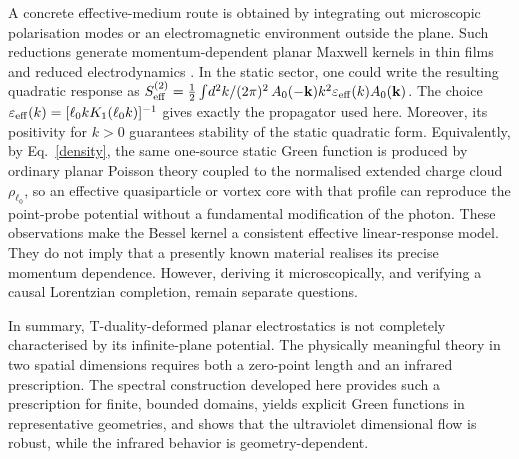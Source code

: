 \documentclass[openacc]{rsproca_new}%
\newcommand{\revadd}[1]{#1}
\begin{document}
\revadd{A concrete effective-medium route is obtained by integrating out microscopic polarisation modes or an electromagnetic environment outside the plane. Such reductions generate momentum-dependent planar Maxwell kernels in thin films and reduced electrodynamics \cite{Pearl1964, LaNaveLimtragoolPhillips2019}. In the static sector, one could write the resulting quadratic response as $S_{\rm eff}^{(2)}=\tfrac12\int \!d^2k/(2\pi)^2\,A_0(-\mathbf k)k^2\varepsilon_{\rm eff}(k)A_0(\mathbf k)$. The choice $\varepsilon_{\rm eff}(k)=[\ell_0kK_1(\ell_0k)]^{-1}$ gives exactly the propagator used here. Moreover, its positivity for $k>0$ guarantees stability of the static quadratic form. Equivalently, by Eq.~\eqref{density}, the same one-source static Green function is produced by ordinary planar Poisson theory coupled to the normalised extended charge cloud $\rho_{\ell_0}$, so an effective quasiparticle or vortex core with that profile can reproduce the point-probe potential without a fundamental modification of the photon. These observations make the Bessel kernel a consistent effective linear-response model. They do not imply that a presently known material realises its precise momentum dependence. However, deriving it microscopically, and verifying a causal Lorentzian completion, remain separate questions.}

In summary, T-duality-deformed planar electrostatics is not completely characterised by its infinite-plane potential. The physically meaningful theory in two spatial dimensions requires both a zero-point length and an infrared prescription. The spectral construction developed here provides such a prescription for finite, bounded domains, yields explicit Green functions in representative geometries, and shows that the ultraviolet dimensional flow is robust, while the infrared behavior is geometry-dependent.




\end{document}
